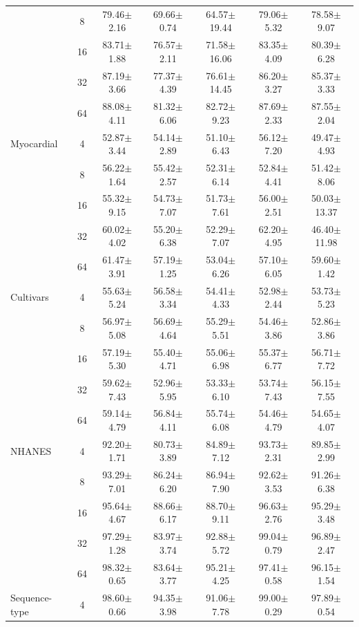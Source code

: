 \documentclass{article}
\theoremstyle{plain}
\theoremstyle{definition}
\theoremstyle{remark}
\begin{document}
\begin{table}[h!]
{\begin{tabular}{@{}lcccccc@{}}
 & 8 & 79.46$\pm$2.16 & 69.66$\pm$0.74 & 64.57$\pm$19.44 & 79.06$\pm$5.32 & 78.58$\pm$9.07 \\
 & 16 & 83.71$\pm$1.88 & 76.57$\pm$2.11 & 71.58$\pm$16.06 & 83.35$\pm$4.09 & 80.39$\pm$6.28 \\
 & 32 & 87.19$\pm$3.66 & 77.37$\pm$4.39 & 76.61$\pm$14.45 & 86.20$\pm$3.27 & 85.37$\pm$3.33 \\
 & 64 & 88.08$\pm$4.11 & 81.32$\pm$6.06 & 82.72$\pm$9.23 & 87.69$\pm$2.33 & 87.55$\pm$2.04 \\ \hline
Myocardial & 4 & 52.87$\pm$3.44 & 54.14$\pm$2.89 & 51.10$\pm$6.43 & 56.12$\pm$7.20 & 49.47$\pm$4.93 \\
 & 8 & 56.22$\pm$1.64 & 55.42$\pm$2.57 & 52.31$\pm$6.14 & 52.84$\pm$4.41 & 51.42$\pm$8.06 \\
 & 16 & 55.32$\pm$9.15 & 54.73$\pm$7.07 & 51.73$\pm$7.61 & 56.00$\pm$2.51 & 50.03$\pm$13.37 \\
 & 32 & 60.02$\pm$4.02 & 55.20$\pm$6.38 & 52.29$\pm$7.07 & 62.20$\pm$4.95 & 46.40$\pm$11.98 \\
 & 64 & 61.47$\pm$3.91 & 57.19$\pm$1.25 & 53.04$\pm$6.26 & 57.10$\pm$6.05 & 59.60$\pm$1.42 \\ \hline
Cultivars & 4 & 55.63$\pm$5.24 & 56.58$\pm$3.34 & 54.41$\pm$4.33 & 52.98$\pm$2.44 & 53.73$\pm$5.23 \\
 & 8 & 56.97$\pm$5.08 & 56.69$\pm$4.64 & 55.29$\pm$5.51 & 54.46$\pm$3.86 & 52.86$\pm$3.86 \\
 & 16 & 57.19$\pm$5.30 & 55.40$\pm$4.71 & 55.06$\pm$6.98 & 55.37$\pm$6.77 & 56.71$\pm$7.72 \\
 & 32 & 59.62$\pm$7.43 & 52.96$\pm$5.95 & 53.33$\pm$6.10 & 53.74$\pm$7.43 & 56.15$\pm$7.55 \\
 & 64 & 59.14$\pm$4.79 & 56.84$\pm$4.11 & 55.74$\pm$6.08 & 54.46$\pm$4.79 & 54.65$\pm$4.07 \\ \hline
NHANES & 4 & 92.20$\pm$1.71 & 80.73$\pm$3.89 & 84.89$\pm$7.12 & 93.73$\pm$2.31 & 89.85$\pm$2.99 \\
 & 8 & 93.29$\pm$7.01 & 86.24$\pm$6.20 & 86.94$\pm$7.90 & 92.62$\pm$3.53 & 91.26$\pm$6.38 \\
 & 16 & 95.64$\pm$4.67 & 88.66$\pm$6.17 & 88.70$\pm$9.11 & 96.63$\pm$2.76 & 95.29$\pm$3.48 \\
 & 32 & 97.29$\pm$1.28 & 83.97$\pm$3.74 & 92.88$\pm$5.72 & 99.04$\pm$0.79 & 96.89$\pm$2.47 \\
 & 64 & 98.32$\pm$0.65 & 83.64$\pm$3.77 & 95.21$\pm$4.25 & 97.41$\pm$0.58 & 96.15$\pm$1.54 \\ \hline
Sequence-type & 4 & 98.60$\pm$0.66 & 94.35$\pm$3.98 & 91.06$\pm$7.78 & 99.00$\pm$0.29 & 97.89$\pm$0.54 \\

\end{tabular}}
\end{table}
\end{document}
